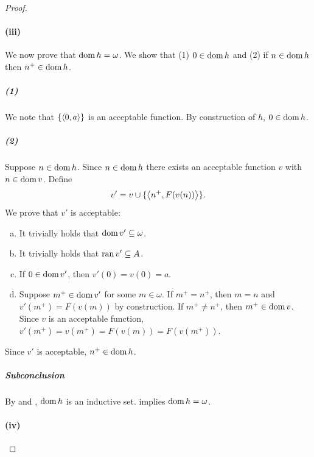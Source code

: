 \documentclass{report}
\begin{document}
\begin{proof}
    \paragraph{(iii)}%

      We now prove that $\mathop{\text{dom}}{h} = \omega$.
      We show that (1) $0 \in \mathop{\text{dom}}{h}$ and (2) if $n \in \mathop{\text{dom}}{h}$ then
        $n^+ \in \mathop{\text{dom}}{h}$.

      \subparagraph{(1)}%

        We note that $\{\left< 0, a \right>\}$ is an acceptable function.
        By construction of $h$, $0 \in \mathop{\text{dom}}{h}$.

      \subparagraph{(2)}%

        Suppose $n \in \mathop{\text{dom}}{h}$.
        Since $n \in \mathop{\text{dom}}{h}$ there exists an acceptable function $v$ with
          $n \in \mathop{\text{dom}}{v}$.
        Define $$v' = v \cup \{\left< n^+, F(v(n)) \right>\}.$$
        We prove that $v'$ is acceptable:

        \begin{enumerate}[(a)]
          \item It trivially holds that $\mathop{\text{dom}}{v'} \subseteq \omega$.
          \item It trivially holds that $\mathop{\text{ran}}{v'} \subseteq A$.
          \item If $0 \in \mathop{\text{dom}}{v'}$, then $v'(0) = v(0) = a$.
          \item
            Suppose $m^+ \in \mathop{\text{dom}}{v'}$ for some $m \in \omega$.
            If $m^+ = n^+$, then $m = n$ and $v'(m^+) = F(v(m))$ by
              construction.
            If $m^+ \neq n^+$, then $m^+ \in \mathop{\text{dom}}{v}$.
            Since $v$ is an acceptable function,
              $v'(m^+) = v(m^+) = F(v(m)) = F(v(m^+))$.
        \end{enumerate}
        Since $v'$ is acceptable, $n^+ \in \mathop{\text{dom}}{h}$.

      \subparagraph{Subconclusion}%

        By  and
          ,
          $\mathop{\text{dom}}{h}$ is an inductive set.
         implies $\mathop{\text{dom}}{h} = \omega$.

    \paragraph{(iv)}%


\end{proof}
\end{document}
